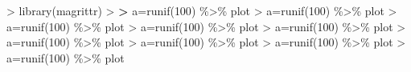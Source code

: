 \documentclass[
]{article}
\newenvironment{Shaded}{\begin{snugshade}}{\end{snugshade}}
\newcommand{\DecValTok}[1]{\textcolor[rgb]{0.00,0.00,0.81}{#1}}
\newcommand{\ErrorTok}[1]{\textcolor[rgb]{0.64,0.00,0.00}{\textbf{#1}}}
\newcommand{\FunctionTok}[1]{\textcolor[rgb]{0.00,0.00,0.00}{#1}}
\newcommand{\NormalTok}[1]{#1}
\newcommand{\OtherTok}[1]{\textcolor[rgb]{0.56,0.35,0.01}{#1}}
\newcommand{\SpecialCharTok}[1]{\textcolor[rgb]{0.00,0.00,0.00}{#1}}
\begin{document}
\begin{Shaded}
\begin{Highlighting}[]
\SpecialCharTok{\textgreater{}} \FunctionTok{library}\NormalTok{(magrittr)}
\SpecialCharTok{\textgreater{}} 
\ErrorTok{\textgreater{}}\NormalTok{ a}\OtherTok{=}\FunctionTok{runif}\NormalTok{(}\DecValTok{100}\NormalTok{) }\SpecialCharTok{\%\textgreater{}\%}\NormalTok{ plot}
\SpecialCharTok{\textgreater{}}\NormalTok{ a}\OtherTok{=}\FunctionTok{runif}\NormalTok{(}\DecValTok{100}\NormalTok{) }\SpecialCharTok{\%\textgreater{}\%}\NormalTok{ plot}
\SpecialCharTok{\textgreater{}}\NormalTok{ a}\OtherTok{=}\FunctionTok{runif}\NormalTok{(}\DecValTok{100}\NormalTok{) }\SpecialCharTok{\%\textgreater{}\%}\NormalTok{ plot}
\SpecialCharTok{\textgreater{}}\NormalTok{ a}\OtherTok{=}\FunctionTok{runif}\NormalTok{(}\DecValTok{100}\NormalTok{) }\SpecialCharTok{\%\textgreater{}\%}\NormalTok{ plot}
\SpecialCharTok{\textgreater{}}\NormalTok{ a}\OtherTok{=}\FunctionTok{runif}\NormalTok{(}\DecValTok{100}\NormalTok{) }\SpecialCharTok{\%\textgreater{}\%}\NormalTok{ plot}
\SpecialCharTok{\textgreater{}}\NormalTok{ a}\OtherTok{=}\FunctionTok{runif}\NormalTok{(}\DecValTok{100}\NormalTok{) }\SpecialCharTok{\%\textgreater{}\%}\NormalTok{ plot}
\SpecialCharTok{\textgreater{}}\NormalTok{ a}\OtherTok{=}\FunctionTok{runif}\NormalTok{(}\DecValTok{100}\NormalTok{) }\SpecialCharTok{\%\textgreater{}\%}\NormalTok{ plot}
\SpecialCharTok{\textgreater{}}\NormalTok{ a}\OtherTok{=}\FunctionTok{runif}\NormalTok{(}\DecValTok{100}\NormalTok{) }\SpecialCharTok{\%\textgreater{}\%}\NormalTok{ plot}
\SpecialCharTok{\textgreater{}}\NormalTok{ a}\OtherTok{=}\FunctionTok{runif}\NormalTok{(}\DecValTok{100}\NormalTok{) }\SpecialCharTok{\%\textgreater{}\%}\NormalTok{ plot}
\end{Highlighting}
\end{Shaded}
\end{document}
